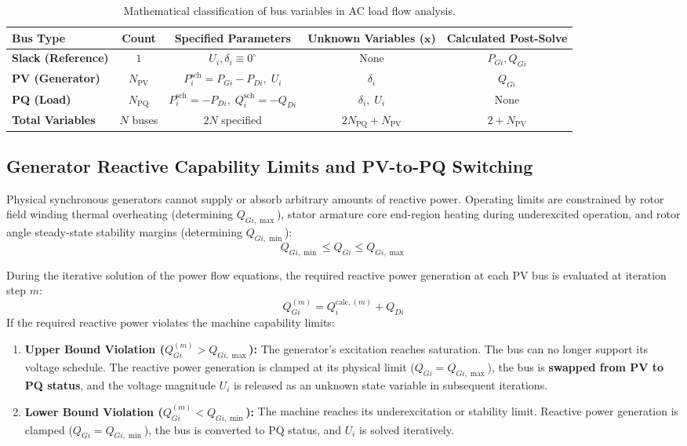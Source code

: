 \documentclass[12pt,a4paper,oneside]{report}
\begin{document}
\begin{table}[H]
\centering
\caption{Mathematical classification of bus variables in AC load flow analysis.}
\label{tab:bus_classification}
\begin{tabular}{lcccc}
\toprule
\textbf{Bus Type} & \textbf{Count} & \textbf{Specified Parameters} & \textbf{Unknown Variables ($\mathbf{x}$)} & \textbf{Calculated Post-Solve} \\
\midrule
\textbf{Slack (Reference)} & $1$ & $U_i, \delta_i \equiv 0^\circ$ & None & $P_{Gi}, Q_{Gi}$ \\
\textbf{PV (Generator)} & $N_{\text{PV}}$ & $P_i^{\text{sch}} = P_{Gi} - P_{Di}, \; U_i$ & $\delta_i$ & $Q_{Gi}$ \\
\textbf{PQ (Load)} & $N_{\text{PQ}}$ & $P_i^{\text{sch}} = -P_{Di}, \; Q_i^{\text{sch}} = -Q_{Di}$ & $\delta_i, \; U_i$ & None \\
\midrule
\textbf{Total Variables} & $N$ buses & $2N$ specified & $2N_{\text{PQ}} + N_{\text{PV}}$ & $2 + N_{\text{PV}}$ \\
\bottomrule
\end{tabular}
\end{table}

\subsection{Generator Reactive Capability Limits and PV-to-PQ Switching}
Physical synchronous generators cannot supply or absorb arbitrary amounts of reactive power. Operating limits are constrained by rotor field winding thermal overheating (determining $Q_{Gi,\max}$), stator armature core end-region heating during underexcited operation, and rotor angle steady-state stability margins (determining $Q_{Gi,\min}$):
\begin{equation}
Q_{Gi,\min} \le Q_{Gi} \le Q_{Gi,\max}
\end{equation}

During the iterative solution of the power flow equations, the required reactive power generation at each PV bus is evaluated at iteration step $m$:
\begin{equation}
Q_{Gi}^{(m)} = Q_i^{\text{calc},(m)} + Q_{Di}
\end{equation}
If the required reactive power violates the machine capability limits:
\begin{enumerate}
    \item \textbf{Upper Bound Violation ($Q_{Gi}^{(m)} > Q_{Gi,\max}$):} The generator's excitation reaches saturation. The bus can no longer support its voltage schedule. The reactive power generation is clamped at its physical limit ($Q_{Gi} = Q_{Gi,\max}$), the bus is \textbf{swapped from PV to PQ status}, and the voltage magnitude $U_i$ is released as an unknown state variable in subsequent iterations.
    \item \textbf{Lower Bound Violation ($Q_{Gi}^{(m)} < Q_{Gi,\min}$):} The machine reaches its underexcitation or stability limit. Reactive power generation is clamped ($Q_{Gi} = Q_{Gi,\min}$), the bus is converted to PQ status, and $U_i$ is solved iteratively.
\end{enumerate}
\end{document}
